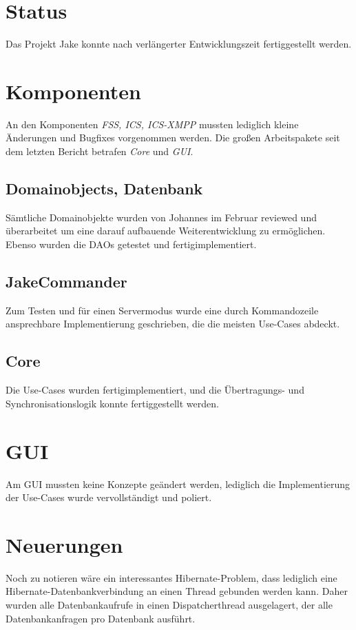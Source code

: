 \setcounter{chapter}{1}
\section{Status}
Das Projekt Jake konnte nach verlängerter Entwicklungszeit fertiggestellt werden.

\section{Komponenten}
An den Komponenten \emph{FSS, ICS, ICS-XMPP} mussten lediglich kleine Änderungen und Bugfixes vorgenommen werden.
Die großen Arbeitspakete seit dem letzten Bericht betrafen \emph{Core} und \emph{GUI}.

\subsection{Domainobjects, Datenbank}
Sämtliche Domainobjekte wurden von Johannes im Februar reviewed und überarbeitet um eine darauf aufbauende Weiterentwicklung zu ermöglichen. Ebenso wurden die DAOs getestet und fertigimplementiert.

\subsection{JakeCommander}
Zum Testen und für einen Servermodus wurde eine durch Kommandozeile ansprechbare Implementierung geschrieben, die die meisten Use-Cases abdeckt.


\subsection{Core}
Die Use-Cases wurden fertigimplementiert, und die Übertragungs- und Synchronisationslogik konnte fertiggestellt werden.


\section{GUI}
Am GUI mussten keine Konzepte geändert werden, lediglich die Implementierung der Use-Cases wurde vervollständigt und poliert.


\section{Neuerungen}
Noch zu notieren wäre ein interessantes Hibernate-Problem, dass lediglich eine Hibernate-Datenbankverbindung an einen Thread gebunden werden kann. Daher wurden alle Datenbankaufrufe in einen Dispatcherthread ausgelagert, der alle Datenbankanfragen pro Datenbank ausführt.

